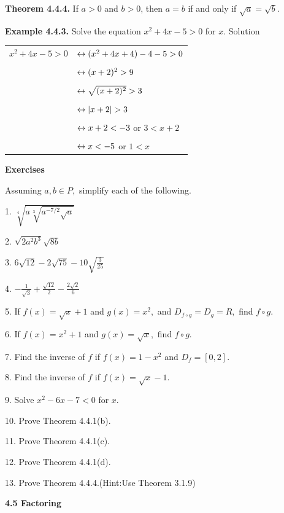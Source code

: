 \textbf{Theorem 4.4.4.}  If $a > 0$ and $b > 0$, then $a = b$ if and only if $\sqrt{a} = \sqrt{b}.$\nl

\textbf{Example 4.4.3.}  Solve the equation $x^{2} + 4x - 5 > 0$ for $x$.\nl
Solution\nl

\begin{tabular}{l l}
$x^{2} + 4x - 5 > 0$&$\leftrightarrow (x^{2} + 4x +4) - 4 - 5 > 0$\\
&\\
&$\leftrightarrow (x + 2)^{2} > 9$\\
&\\
&$\leftrightarrow \sqrt{(x + 2)^{2}} > 3$\\
&\\
&$\leftrightarrow \left|x + 2\right| > 3$\\
&\\
&$\leftrightarrow x + 2 < -3$ or $3 < x + 2$\\
&\\
&$\leftrightarrow x < -5$ or $1 < x$\\
\end{tabular}

\newpage
\textbf{Exercises}\nl

Assuming $a,b\in P,$ simplify each of the following.

1. $\sqrt[4]{a^{}\sqrt[3]{a^{-7/2}\sqrt{a}}}$\nl

2. $\sqrt{2a^{2}b^{3}}\sqrt{8b}$\nl

3. $6\sqrt{12} - 2\sqrt{75} -10 \sqrt{\frac{3}{25}}$\nl

4. $-\frac{1}{\sqrt{3}} + \frac{\sqrt{12}}{2} - \frac{2\sqrt{2}}{6}$\nl

5. If $f(x) = \sqrt{x} + 1$  and $g(x) = x^{2},$ and $D_{f\circ g} = D_{g} =R,$ find $f\circ g.$\nl

6. If $f(x) = x^{2} + 1$ and $g(x) = \sqrt{x},$ find $f\circ g.$\nl

7. Find the inverse of $f$ if $f(x) = 1 - x^{2}$ and $D_{f} = [0,2].$\nl

8. Find the inverse of $f$ if $f(x) = \sqrt{x} - 1.$\nl

9. Solve $x^{2} - 6x - 7 < 0$ for $x.$\nl

10. Prove Theorem 4.4.1(b). \nl

11. Prove Theorem 4.4.1(c). \nl

12. Prove Theorem 4.4.1(d). \nl

13. Prove Theorem 4.4.4.(Hint:Use Theorem 3.1.9) \nl

\vfill

\textbf{4.5 Factoring}\nl

